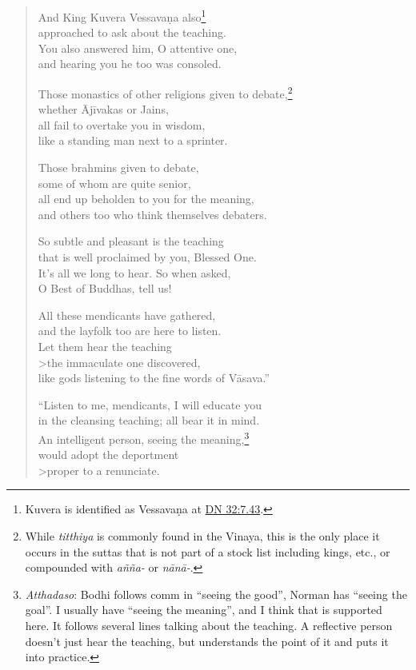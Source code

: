 \documentclass[12pt,openany]{book}%
\begin{document}
\begin{verse}
And King Kuvera \textsanskrit{Vessavaṇa} also\footnote{Kuvera is identified as \textsanskrit{Vessavaṇa} at \href{https://suttacentral.net/dn32/en/sujato\#7.43}{DN 32:7.43}. } \\
approached to ask about the teaching. \\
You also answered him, O attentive one, \\
and hearing you he too was consoled. 

Those monastics of other religions given to debate,\footnote{While \textit{titthiya} is commonly found in the Vinaya, this is the only place it occurs in the suttas that is not part of a stock list including kings, etc., or compounded with \textit{\textsanskrit{añña}-} or \textit{\textsanskrit{nānā}-}. } \\
whether \textsanskrit{Ājīvakas} or Jains, \\
all fail to overtake you in wisdom, \\
like a standing man next to a sprinter. 

Those brahmins given to debate, \\
some of whom are quite senior, \\
all end up beholden to you for the meaning, \\
and others too who think themselves debaters. 

So subtle and pleasant is the teaching \\
that is well proclaimed by you, Blessed One. \\
It’s all we long to hear. So when asked, \\
O Best of Buddhas, tell us! 

All these mendicants have gathered, \\
and the layfolk too are here to listen. \\
Let them hear the teaching \\>the immaculate one discovered, \\
like gods listening to the fine words of \textsanskrit{Vāsava}.” 

“Listen to me, mendicants, I will educate you \\
in the cleansing teaching; all bear it in mind. \\
An intelligent person, seeing the meaning,\footnote{\textit{Atthadaso}: Bodhi follows comm in “seeing the good”, Norman has “seeing the goal”. I usually have “seeing the meaning”, and I think that is supported here. It follows several lines talking about the teaching. A reflective person doesn't just hear the teaching, but understands the point of it and puts it into practice. } \\
would adopt the deportment \\>proper to a renunciate. 


\end{verse}
\end{document}
